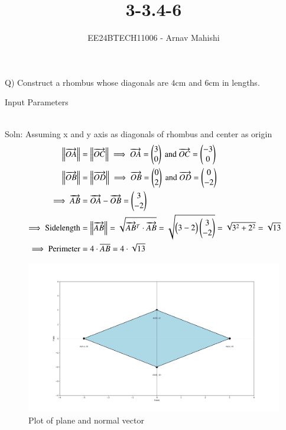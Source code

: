 \documentclass[journal]{IEEEtran}
\begin{document}

\vspace{3cm}

\title{3-3.4-6}
\author{EE24BTECH11006 - Arnav Mahishi}
{\let\newpage\relax\maketitle}

\renewcommand{\thefigure}{\theenumi}
\renewcommand{\thetable}{\theenumi}
\setlength{\intextsep}{10pt} %


\renewcommand{\thetable}{\theenumi}
Q) Construct a rhombus whose diagonals are $4$cm and $6$cm in lengths.\\
\begin{table}[h!]    
  \centering
  
  \caption{Input Parameters}
\end{table}\\
Soln: Assuming x and y axis as diagonals of rhombus and center as origin\\
\begin{align}
\left\lVert\overrightarrow{OA}\right\rVert&=\left\lVert\overrightarrow{OC}\right\rVert\implies \overrightarrow{OA}=\begin{pmatrix}3\\0\end{pmatrix}\text{ and }\overrightarrow{OC}=\begin{pmatrix}-3\\0\end{pmatrix}\\
\left\lVert\overrightarrow{OB}\right\rVert&=\left\lVert\overrightarrow{OD}\right\rVert\implies \overrightarrow{OB}=\begin{pmatrix}0\\2\end{pmatrix}\text{ and }\overrightarrow{OD}=\begin{pmatrix}0\\-2\end{pmatrix}\\
\implies\overrightarrow{AB}&=\overrightarrow{OA}-\overrightarrow{OB}=\begin{pmatrix}3\\-2\end{pmatrix}\\
\implies\text{Sidelength}&=\left\lVert\overrightarrow{AB}\right\rVert=\sqrt{\overrightarrow{AB}^T\cdot\overrightarrow{AB}}=\sqrt{\begin{pmatrix}3 -2\end{pmatrix}\begin{pmatrix}3\\-2\end{pmatrix}}=\sqrt{3^2+2^2}=\sqrt{13}\\
\implies\text{Perimeter}&=4\cdot\overline{AB}=4\cdot\sqrt{13}
\end{align}
\begin{figure}[h!]
   \centering
   \includegraphics[width=0.7\linewidth]{figs/Figure_1.png}
   \caption{Plot of plane and normal vector}
   \label{stemplot}
\end{figure}
\end{document}
